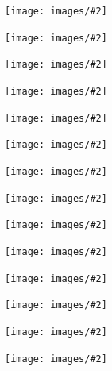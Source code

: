 \documentclass[fontsize=20pt]{scrartcl}
\newcommand{\calpage}[2]{
  \centering
  \begin{minipage}{\textwidth}
    \centering
    \texttt{[image: images/\#2]}
  \end{minipage}

  \begin{minipage}{\textwidth}
    \vspace*{4cm}
  \end{minipage}

  \begin{minipage}{\textwidth}
    \centering
    \iftoggle{swedish}{%
      \begin{tikzpicture}[thick]
        \calendar[dates=#1-01 to #1-last,
        week list,
        month label above centered,
        month text=\textsc{\%mt \%y0},
        day headings={font=\footnotesize},
        day letter headings]
        if (Monday) [week number]
        if (Sunday,
        equals=01-01, %
        equals=2017-01-06, %
        Easter=-2, %
        Easter=1,  %
        equals=05-01, %
        Easter=39, %
        Easter=49, %
        equals=06-06, %
        equals=2017-06-24, %
        equals=2017-11-04, %
        equals=12-25, %
        equals=12-26 %
        ) [red]
        if(equals=01-01) [observance = Nyårsdagen]
        if(equals=2017-01-06) [observance = Trettondagen]
        if(Easter=-2) [observance = Långfredag]
        if(Easter=1) [observance =  Annandag påsk]
        if(equals=05-01) [observance = Första maj]
        if(Easter=39) [observance = Kristihimmelfärd]
        if(Easter=49) [observance = Pingst]
        if(equals=06-06) [observance = Flaggdagen]
        if(equals=2017-06-24) [observance = Midsommar]
        if(equals=2017-11-04) [observance = Alla helgons dag]
        if(equals=12-25) [observance = Juldagen]
        if(equals=12-26) [observance = Annandag Jul]
        if (equals=07-21) [birthday=Thomas]
        if (equals=05-14) [birthday=Kai]
        if (equals=01-28) [birthday=Karsten]
        if (equals=09-25) [birthday={Bob, Beth, Jane}]
        if (equals=06-08) [birthday=Barb]
        if (equals=10-06) [birthday=Erin]
        if (equals=08-27) [birthday=Hannah]
        if (equals=05-03) [birthday=Myles]
        if (equals=01-22) [birthday=Vivian]
        if (equals=11-02) [birthday=Eithan]
        ;
      \end{tikzpicture}}{%
      \begin{tikzpicture}[thick]
        \calendar[dates=#1-01 to #1-last,
        week list,
        month label above centered,
        month text=\textsc{\%mt \%y0},
        day headings={font=\footnotesize},
        day letter headings]
        if (Sunday,
        equals=01-01, %
        equals=2017-02-20, %
        Easter=-2, %
        Easter=1,  %
        equals=2017-05-22, %
        equals=07-01, %
        equals=2017-08-07, %
        equals=2017-09-04, %
        equals=2017-10-09, %
        equals=12-25, %
        equals=12-26 %
        ) [red]
        if(equals=01-01) [observance= Newyears day ]
        if(equals=2017-02-20) [observance= Family day]
        if(Easter=-2) [observance= Good Friday]
        if(Easter=1) [observance= Easter Monday]
        if(equals=2017-05-22) [observance= Victoria Day]
        if(equals=07-01) [observance= Canada day]
        if(equals=2017-08-07) [observance= Civic Holiday]
        if(equals=2017-09-04) [observance= Labour Day]
        if(equals=2017-10-09) [observance= Thanksgiving]
        if(equals=12-25) [observance= Christmas Day]
        if(equals=12-26) [observance = Boxing Day]
        if (equals=07-21) [birthday=Thomas]
        if (equals=05-14) [birthday=Kai]
        if (equals=01-28) [birthday=Karsten]
        if (equals=09-25) [birthday={Bob, Beth, Jane}]
        if (equals=06-08) [birthday=Barb]
        if (equals=10-06) [birthday=Erin]
        if (equals=08-27) [birthday=Hannah]
        if (equals=05-03) [birthday=Myles]
        if (equals=01-22) [birthday=Vivian]
        if (equals=11-02) [birthday=Eithan]
        ;
      \end{tikzpicture}
    } %
  \end{minipage}
}
\begin{document}
\calpage{2016-12}{image1.jpg}
\calpage{2017-01}{image1.jpg}
\calpage{2017-02}{image1.jpg}
\calpage{2017-03}{image1.jpg}
\calpage{2017-04}{image1.jpg}
\calpage{2017-05}{image1.jpg}
\calpage{2017-06}{image1.jpg}
\calpage{2017-07}{image1.jpg}
\calpage{2017-08}{image1.jpg}
\calpage{2017-09}{image1.jpg}
\calpage{2017-10}{image1.jpg}
\calpage{2017-11}{image1.jpg}
\calpage{2017-12}{image1.jpg}
\calpage{2018-01}{image1.jpg}
\end{document}

